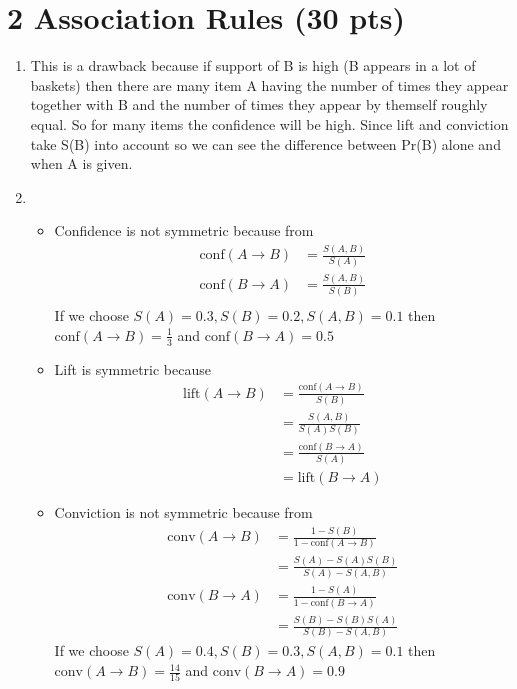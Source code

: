 \documentclass[12pt]{article}
\begin{document}
\section*{2 Association Rules (30 pts)}
\begin{enumerate}[label=(\alph*)]
	\item This is a drawback because if support of B is high (B appears in a lot of baskets) then there are many item A having the number of times they appear together with B and the number of times they appear by themself roughly equal. So for many items the confidence will be high. Since lift and conviction take S(B) into account so we can see the difference between Pr(B) alone and when A is given.
	\item 
	\begin{itemize}
		\item Confidence is not symmetric because from
		\begin{align*}
			\text{conf}(A \rightarrow B) &= \frac{S(A,B)}{S(A)} \\
			\text{conf}(B \rightarrow A) &= \frac{S(A,B)}{S(B)} \\
		\end{align*}
		If we choose $S(A) = 0.3, S(B) = 0.2, S(A,B) = 0.1$ then $\text{conf}(A \rightarrow B) = \frac{1}{3}$ and $\text{conf}(B \rightarrow A) = 0.5$
		\item Lift is symmetric because
		\begin{align*}
			\text{lift}(A \rightarrow B) &= \frac{\text{conf}(A \rightarrow B)}{S(B)} \\
			&=\frac{S(A, B)}{S(A)S(B)} \\
			&= \frac{\text{conf}(B \rightarrow A)}{S(A)} \\
			&= \text{lift}(B \rightarrow A)
		\end{align*}
		\item Conviction is not symmetric because from
		\begin{align*}
			\text{conv}(A \rightarrow B) &= \frac{1 - S(B)}{1 - \text{conf}(A \rightarrow B)} \\
			&= \frac{S(A) - S(A)S(B)}{S(A) - S(A, B)}
		\end{align*}
		\begin{align*}
			\text{conv}(B \rightarrow A) &= \frac{1 - S(A)}{1 - \text{conf}(B \rightarrow A)} \\
			&= \frac{S(B) - S(B)S(A)}{S(B) - S(A, B)}
		\end{align*}
		If we choose $S(A)=0.4, S(B)=0.3, S(A, B) = 0.1$ then $\text{conv}(A \rightarrow B) = \frac{14}{15}$ and $\text{conv}(B \rightarrow A) = 0.9$

\end{itemize}
\end{enumerate}
\end{document}
